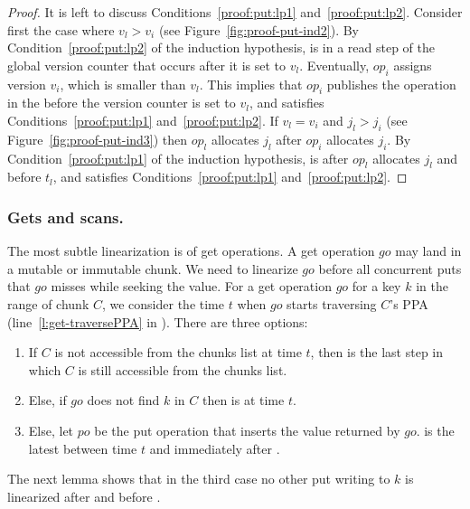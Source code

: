 \begin{proof}
It is left to discuss Conditions~\ref{proof:put:lp1} and~\ref{proof:put:lp2}. Consider first the case where $v_l>v_i$  (see Figure~\ref{fig:proof-put-ind2}). By Condition~\ref{proof:put:lp2} of the induction hypothesis,  is in a read step of the global version counter that occurs after it is set to $v_l$. Eventually, $op_i$  assigns version $v_i$, which is smaller than $v_l$. This implies that $op_i$ publishes the operation in the  before the version counter is set to $v_l$, and   satisfies Conditions~\ref{proof:put:lp1} and~\ref{proof:put:lp2}. If $v_l =v_i$ and $j_l>j_i$  (see Figure~\ref{fig:proof-put-ind3}) then $op_l$ allocates $j_l$ after $op_i$ allocates $j_i$. By Condition~\ref{proof:put:lp1} of the induction hypothesis,  is after $op_l$ allocates $j_l$  and before $t_l$, and   satisfies Conditions~\ref{proof:put:lp1} and~\ref{proof:put:lp2}. 

\end{proof}




\subsubsection{Gets and scans.}
\label{ssec:get-proof}

The most subtle linearization is of get operations.
A get operation $go$ may land in a mutable or immutable chunk. 
We need to linearize $go$ before all concurrent puts that $go$ misses while seeking the value.
For a get operation $go$ for a key $k$ in the range of chunk $C$, we consider the time $t$ when $go$ starts traversing $C$'s PPA (line~\ref{l:get-traversePPA} in ). There are three options:
\begin{enumerate}
\setlength{\itemsep}{0pt}
\setlength{\parskip}{0pt}
\item If $C$ is not accessible from the chunks list at time $t$, then  is the last step in which $C$ is still accessible from the chunks list.
\item Else, if $go$ does not find $k$ in $C$ then  is at time $t$.
\item Else, let $po$ be the put operation that inserts the value returned by $go$.  is the latest between time $t$ and immediately after .
\end{enumerate}


The next lemma shows that in the third case no other put writing to $k$ is linearized after  and before .

